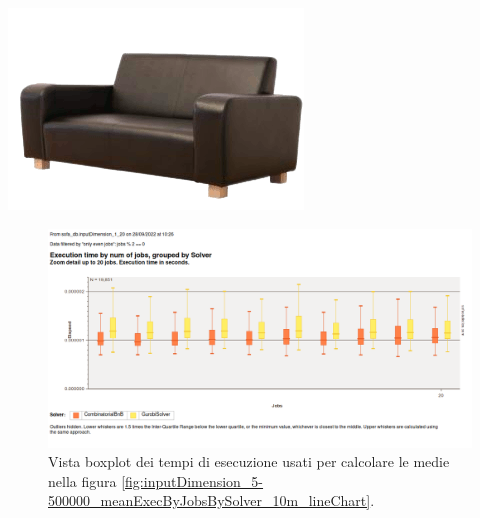 \documentclass[compress]{beamer}
\begin{document}
    \begin{frame}{\subsecname \hfill \includegraphics[scale=0.1]{figs/sofastatsLogo.png}}
        \begin{figure}
            \includegraphics[scale=0.4]{../proofs/inputDimension_1-20_execByJobsBySolver_boxPlot_evenJobs.png}
            \caption[]{Vista boxplot dei tempi di esecuzione usati per calcolare le medie
            nella figura \ref{fig:inputDimension_5-500000_meanExecByJobsBySolver_10m_lineChart}.}
        \end{figure}        
    \end{frame}
\end{document}
